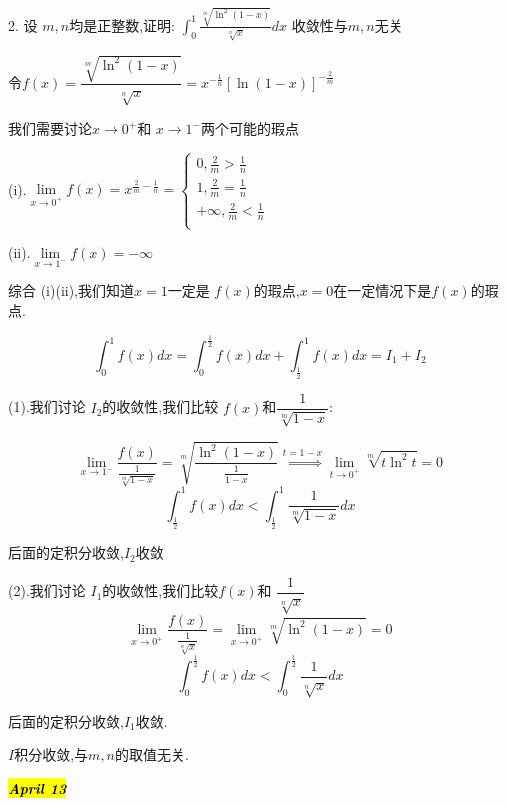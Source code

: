2. 设 $m,n$均是正整数,证明: $\int_{0}^{1}\frac{\sqrt[m]{\ln^{2}(1-x)}}{\sqrt[n]{x}}dx$ 收敛性与$m,n$无关
\begin{solution}
	
	令$f(x)=\dfrac{\sqrt[m]{\ln^{2}(1-x)}}{\sqrt[n]{x}}=x^{-\frac{1}{n}}[\ln(1-x)]^{-\frac{2}{m}}$
	
	我们需要讨论$x\rightarrow 0^{+}$和 $x\rightarrow 1^{-}$两个可能的瑕点
	
	(i).$\lim\limits_{x\rightarrow 0^{+}}f(x)=x^{\frac{2}{m}-\frac{1}{n}}=
	\left\lbrace
	\begin{array}{l}
		0,\frac{2}{m}>\frac{1}{n}\\
		1,\frac{2}{m}=\frac{1}{n}\\
		+\infty,\frac{2}{m}<\frac{1}{n}\\
	\end{array}
	\right. $
	
	(ii).$\lim\limits_{x\rightarrow 1^{-}}f(x)=-\infty$
	
	
	综合 (i)(ii),我们知道$x=1$一定是 $f(x)$的瑕点,$x=0$在一定情况下是$f(x)$的瑕点.
	
	$$\int_{0}^{1}f(x)dx=\int_{0}^{\frac{1}{2}}f(x)dx+\int_{\frac{1}{2}}^{1}f(x)dx=I_{1}+I_{2}$$
	
	(1).我们讨论 $I_{2}$的收敛性,我们比较 $f(x)$和$\dfrac{1}{\sqrt[m]{1-x}}$: 
	
	$$\lim\limits_{x\rightarrow 1^{-}}\frac{f(x)}{\frac{1}{\sqrt[m]{1-x}}}=\sqrt[m]{\frac{\ln^{2}(1-x)}{\frac{1}{1-x}}}\overset{t=1-x}{\Rightarrow}\lim\limits_{t\rightarrow 0^{+}}\sqrt[m]{t\ln^2 t}=0$$
	$$\int_{\frac{1}{2}}^{1}f(x)dx<\int_{\frac{1}{2}}^{1}\frac{1}{\sqrt[m]{1-x}}dx$$
	
	后面的定积分收敛,$I_{2}$收敛
	
	(2).我们讨论 $I_{1}$的收敛性,我们比较$f(x)$和 $\dfrac{1}{\sqrt[n]{x}}$
	$$\lim\limits_{x\rightarrow 0^{+}}\frac{f(x)}{\frac{1}{\sqrt[n]{x}}}=\lim\limits_{x\rightarrow 0^{+}}\sqrt[m]{\ln^{2}(1-x)}=0$$
	$$\int_{0}^{\frac{1}{2}}f(x)dx<\int_{0}^{\frac{1}{2}}\frac{1}{\sqrt[n]{x}}dx$$
	
	后面的定积分收敛,$I_{1}$收敛.
	
	$I$积分收敛,与$m,n$的取值无关.	
\end{solution}

\hl{\textbf{\textit{April 13}}}

